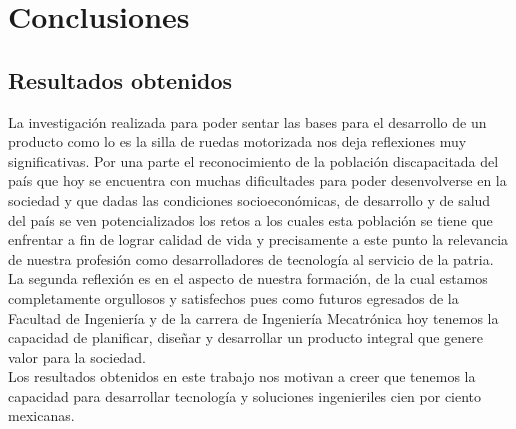 
\chapter{Conclusiones} %

\label{Chapter5} %




\section{Resultados obtenidos}
La investigaci\'on realizada para poder sentar las bases para el desarrollo de
un producto como lo es la silla de ruedas motorizada nos deja reflexiones muy
significativas. Por una parte el reconocimiento de la poblaci\'on discapacitada
del pa\'is que hoy se encuentra con muchas dificultades para poder desenvolverse
en la sociedad y que dadas las condiciones socioecon\'omicas, de desarrollo y de
salud del pa\'is se ven potencializados los retos a los cuales esta poblaci\'on
se tiene que enfrentar a fin de lograr calidad de vida y precisamente a este
punto la relevancia de nuestra profesi\'on como desarrolladores de tecnolog\'ia
al servicio de la patria.\\
La segunda reflexi\'on es en el aspecto de nuestra formaci\'on, de la cual
estamos completamente orgullosos y satisfechos pues como futuros egresados de la
Facultad de Ingenier\'ia y de la carrera de Ingenier\'ia Mecatr\'onica hoy
tenemos la capacidad de planificar, diseñar y desarrollar un producto integral
que genere valor para la sociedad.\\
Los resultados obtenidos en este trabajo nos motivan a creer que tenemos la capacidad para desarrollar tecnolog\'ia y soluciones ingenieriles cien por ciento mexicanas.
